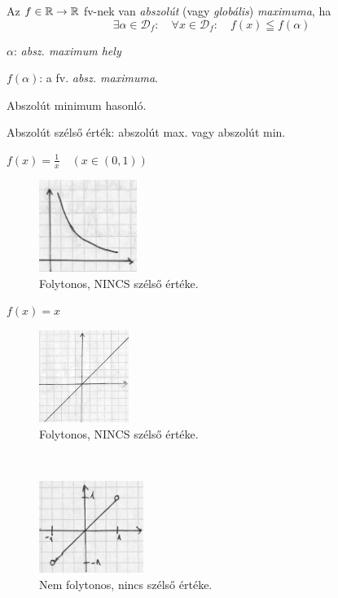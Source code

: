 \documentclass[a4paper,11.5pt]{article}
\begin{document}
		\begin{definition}
			Az $f\in\mathbb{R}\to\mathbb{R}$ fv-nek van \textit{abszolút} (vagy \textit{globális}) \textit{maximuma}, ha 
			\[ \exists \alpha\in\mathcal{D}_f: \quad \forall x\in\mathcal{D}_f: \quad f(x)\leqq f(\alpha) \]
			
			$\alpha$: \textit{absz. maximum hely}
			
			$f(\alpha)$: a fv. \textit{absz. maximuma}.
		\end{definition}
		
		\begin{note}
			Abszolút minimum hasonló.
		\end{note}
		\begin{note}
			Abszolút szélső érték: abszolút max. vagy abszolút min.
		\end{note}
		
		\begin{example}
			$f(x) =\displaystyle  \frac{1}{x} \quad (x\in (0,1))$
			
			\begin{figure}[H]
				\centering
				\includegraphics[height=3cm]{kepek/4_abra.jpg}
				\caption{Folytonos, NINCS szélső értéke.}\label{fig_4}
			\end{figure}
		\end{example}
		
		\begin{example}
			$f(x) = x$
			
			\begin{figure}[!h]
				\centering
				\includegraphics[height=3cm]{kepek/5_abra.jpg}
				\caption{Folytonos, NINCS szélső értéke.}\label{fig_5}
			\end{figure}
			
		\end{example}
		
		\begin{example}\
			
			 \begin{figure}[!h]
			 	\centering
			 	\includegraphics[height=3cm]{kepek/6_abra.jpg}
			 	\caption{Nem folytonos, nincs szélső értéke.}\label{fig_6}
			 \end{figure}
			
			
		\end{example}
		
\end{document}
